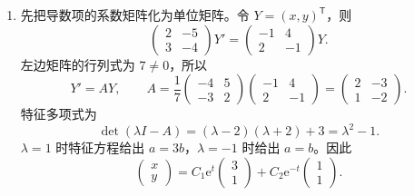 \documentclass[UTF8,a4paper,11pt]{ctexart}
\newcommand{\e}{\mathrm e}
\begin{document}
\begin{solution}
\begin{enumerate}[label=(\arabic*)]
\item 先把导数项的系数矩阵化为单位矩阵。令 $Y=(x,y)^{\mathsf T}$，则
\[
\begin{pmatrix}2&-5\\3&-4\end{pmatrix}Y'
=\begin{pmatrix}-1&4\\2&-1\end{pmatrix}Y.
\]
左边矩阵的行列式为 $7\ne0$，所以
\[
Y'=AY,\qquad
A=\frac17\begin{pmatrix}-4&5\\-3&2\end{pmatrix}
\begin{pmatrix}-1&4\\2&-1\end{pmatrix}
=\begin{pmatrix}2&-3\\1&-2\end{pmatrix}.
\]
特征多项式为
\[
\det(\lambda I-A)=(\lambda-2)(\lambda+2)+3
=\lambda^2-1.
\]
$\lambda=1$ 时特征方程给出 $a=3b$，$\lambda=-1$ 时给出 $a=b$。因此
\[
\boxed{
\begin{pmatrix}x\\y\end{pmatrix}
=C_1\e^t\begin{pmatrix}3\\1\end{pmatrix}
+C_2\e^{-t}\begin{pmatrix}1\\1\end{pmatrix}.}
\]


\end{enumerate}
\end{solution}
\end{document}
